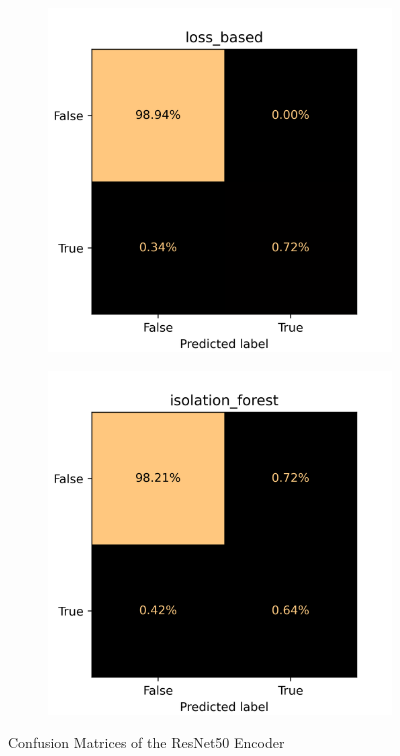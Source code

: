 \begin{figure}[H]
    \centering
    \begin{subfigure}{0.4\textwidth}
        \centering
        \includegraphics[width=\textwidth]{./results/resnet50_vgg19/20230514_213740_loss_based_cm.png}
    \end{subfigure}
    \begin{subfigure}{0.4\textwidth}
        \centering
        \includegraphics[width=\textwidth]{./results/resnet50_vgg19/20230514_213740_isolation_forest_cm.png}
    \end{subfigure}
    \caption{Confusion Matrices of the ResNet50 Encoder}
    \label{fig:resnet50_cm}
\end{figure}